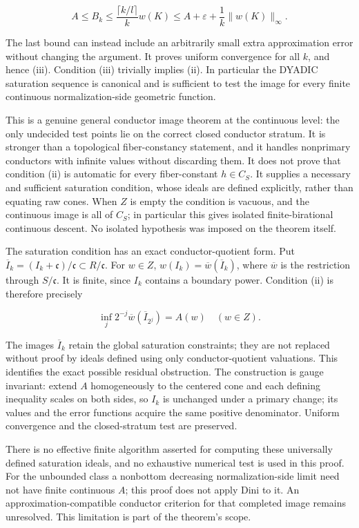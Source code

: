\documentclass[11pt]{article}
\begin{document}
\[
A\le B_k\le\frac{\lceil k/l\rceil}{k}w(K)\le A+\varepsilon+\frac1k\|w(K)\|_\infty.
\]

The last bound can instead include an arbitrarily small extra approximation error without changing the argument. It proves uniform convergence for all $k$, and hence (iii). Condition (iii) trivially implies (ii). In particular the DYADIC saturation sequence is canonical and is sufficient to test the image for every finite continuous normalization-side geometric function.

This is a genuine general conductor image theorem at the continuous level: the only undecided test points lie on the correct closed conductor stratum. It is stronger than a topological fiber-constancy statement, and it handles nonprimary conductors with infinite values without discarding them. It does not prove that condition (ii) is automatic for every fiber-constant $h\in C_S$. It supplies a necessary and sufficient saturation condition, whose ideals are defined explicitly, rather than equating raw cones. When $Z$ is empty the condition is vacuous, and the continuous image is all of $C_S$; in particular this gives isolated finite-birational continuous descent. No isolated hypothesis was imposed on the theorem itself.

The saturation condition has an exact conductor-quotient form. Put $\overline I_k=(I_k+\mathfrak c)/\mathfrak c\subset R/\mathfrak c$. For $w\in Z$, $w(I_k)=\overline w(\overline I_k)$, where $\overline w$ is the restriction through $S/\mathfrak c$. It is finite, since $I_k$ contains a boundary power. Condition (ii) is therefore precisely

\[
\inf_j 2^{-j}\overline w(\overline I_{2^j})=A(w)\quad(w\in Z).
\]

The images $\overline I_k$ retain the global saturation constraints; they are not replaced without proof by ideals defined using only conductor-quotient valuations. This identifies the exact possible residual obstruction. The construction is gauge invariant: extend $A$ homogeneously to the centered cone and each defining inequality scales on both sides, so $I_k$ is unchanged under a primary change; its values and the error functions acquire the same positive denominator. Uniform convergence and the closed-stratum test are preserved.

There is no effective finite algorithm asserted for computing these universally defined saturation ideals, and no exhaustive numerical test is used in this proof. For the unbounded class a nonbottom decreasing normalization-side limit need not have finite continuous $A$; this proof does not apply Dini to it. An approximation-compatible conductor criterion for that completed image remains unresolved. This limitation is part of the theorem's scope.
\end{document}
